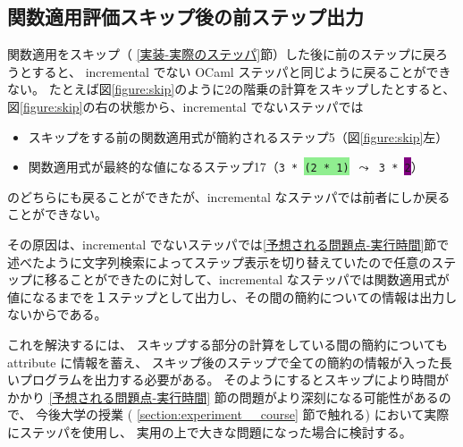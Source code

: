 \subsection{関数適用評価スキップ後の前ステップ出力}

関数適用をスキップ（ \ref{実装-実際のステッパ}節）した後に前のステップに戻ろうとすると、
incremental でない OCaml ステッパと同じように戻ることができない。
たとえば図\ref{figure:skip}のように2の階乗の計算をスキップしたとすると、
図\ref{figure:skip}の右の状態から、incremental でないステッパでは
\begin{itemize}
\item スキップをする前の関数適用式が簡約されるステップ5（図\ref{figure:skip}左）
\item 関数適用式が最終的な値になるステップ17（\texttt{3 * \colorbox{lightgreen}{(2 * 1)} $\leadsto$ 3 * \colorbox{purple}{2}}）
\end{itemize}
のどちらにも戻ることができたが、incremental なステッパでは前者にしか戻ることができない。

その原因は、incremental でないステッパ\cite{FCA19}では\ref{予想される問題点-実行時間}節で述べたように文字列検索によってステップ表示を切り替えていたので任意のステップに移ることができたのに対して、incremental なステッパでは関数適用式が値になるまでを１ステップとして出力し、その間の簡約についての情報は出力しないからである。

これを解決するには、
スキップする部分の計算をしている間の簡約についても attribute に情報を蓄え、
スキップ後のステップで全ての簡約の情報が入った長いプログラムを出力する必要がある。
そのようにするとスキップにより時間がかかり
\ref{予想される問題点-実行時間} 節の問題がより深刻になる可能性があるので、
今後大学の授業 ( \ref{section:experiment__course} 節で触れる) において実際にステッパを使用し、
実用の上で大きな問題になった場合に検討する。
